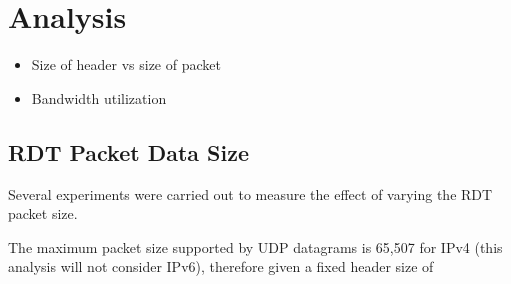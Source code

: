 \section{Analysis}

\begin{itemize}
    \item Size of header vs size of packet
    \item Bandwidth utilization
\end{itemize}

\subsection{RDT Packet Data Size}

Several experiments were carried out to measure the effect of varying the RDT packet size. 

The maximum packet size supported by UDP datagrams is 65,507 for IPv4 (this analysis will not consider IPv6), therefore given a fixed header size of 